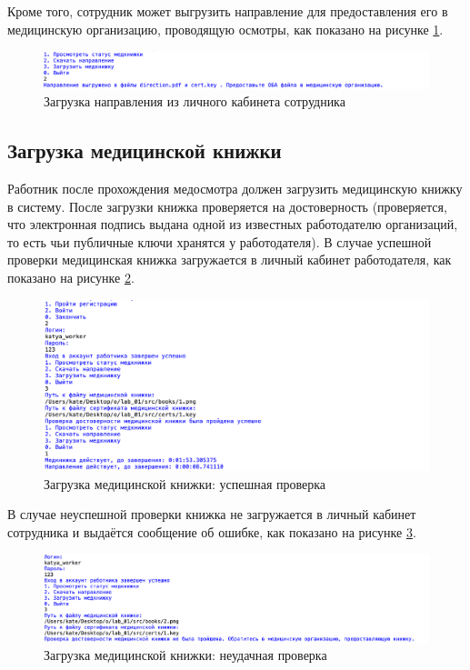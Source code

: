 \documentclass[12pt]{report}
\begin{document}
Кроме того, сотрудник может выгрузить направление для предоставления его в медицинскую организацию, проводящую осмотры, как показано на рисунке \ref{dir-worker-load}. 


\begin{figure}[h!]
	\centering
	\includegraphics[width = \linewidth]{worker-load-direction.png}
	\caption{Загрузка направления из личного кабинета сотрудника}
	\label{dir-worker-load}
\end{figure}


\subsection{Загрузка медицинской книжки}

Работник после прохождения медосмотра должен загрузить медицинскую книжку в систему. 
После загрузки книжка проверяется на достоверность (проверяется, что электронная подпись выдана одной из известных работодателю организаций, то есть чьи публичные ключи хранятся у работодателя).
В случае успешной проверки медицинская книжка загружается в личный кабинет работодателя, как показано на рисунке \ref{fig:medbook-success}.

\begin{figure}[h!]
	\centering
	\includegraphics[scale=0.8]{medbook-success.png}
	\caption{Загрузка медицинской книжки: успешная проверка}
	\label{fig:medbook-success}
\end{figure}


В случае неуспешной проверки книжка не загружается в личный кабинет сотрудника и выдаётся сообщение об ошибке, как показано на рисунке \ref{fig:medbook-failure}.

\begin{figure}[h!]
	\centering
	\includegraphics[width = \linewidth]{medbook-failure.png}
	\caption{Загрузка медицинской книжки: неудачная проверка}
	\label{fig:medbook-failure}
\end{figure}
\newpage
\end{document}
